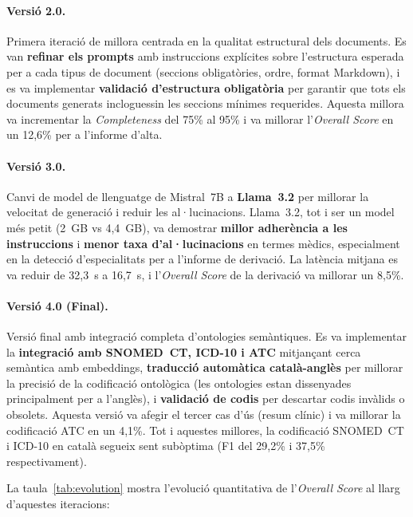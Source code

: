 \documentclass[CAT]{TFUOC}%
\begin{document}
\paragraph{Versió 2.0.}
Primera iteració de millora centrada en la qualitat estructural dels documents. Es van \textbf{refinar els prompts} amb instruccions explícites sobre l'estructura esperada per a cada tipus de document (seccions obligatòries, ordre, format Markdown), i es va implementar \textbf{validació d'estructura obligatòria} per garantir que tots els documents generats incloguessin les seccions mínimes requerides. Aquesta millora va incrementar la \textit{Completeness} del 75\% al 95\% i va millorar l'\textit{Overall Score} en un 12,6\% per a l'informe d'alta.

\paragraph{Versió 3.0.}
Canvi de model de llenguatge de Mistral~7B a \textbf{Llama~3.2} per millorar la velocitat de generació i reduir les al·lucinacions. Llama~3.2, tot i ser un model més petit (2~GB vs 4,4~GB), va demostrar \textbf{millor adherència a les instruccions} i \textbf{menor taxa d'al·lucinacions} en termes mèdics, especialment en la detecció d'especialitats per a l'informe de derivació. La latència mitjana es va reduir de 32,3~s a 16,7~s, i l'\textit{Overall Score} de la derivació va millorar un 8,5\%.

\paragraph{Versió 4.0 (Final).}
Versió final amb integració completa d'ontologies semàntiques. Es va implementar la \textbf{integració amb SNOMED~CT, ICD-10 i ATC} mitjançant cerca semàntica amb embeddings, \textbf{traducció automàtica català-anglès} per millorar la precisió de la codificació ontològica (les ontologies estan dissenyades principalment per a l'anglès), i \textbf{validació de codis} per descartar codis invàlids o obsolets. Aquesta versió va afegir el tercer cas d'ús (resum clínic) i va millorar la codificació ATC en un 4,1\%. Tot i aquestes millores, la codificació SNOMED~CT i ICD-10 en català segueix sent subòptima (F1 del 29,2\% i 37,5\% respectivament).

La taula~\ref{tab:evolution} mostra l'evolució quantitativa de l'\textit{Overall Score} al llarg d'aquestes iteracions:
\end{document}
